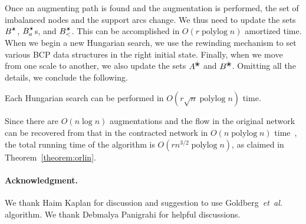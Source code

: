 \documentclass[11pt,twoside]{article}
\def\etal{\emph{et~al.}}
\def\etal{\textit{et~al.}}
\def\polylog{\mathop{\mathrm{polylog}}}
\def\alive#1{{#1}^\text{\ding{96}}}
\def\star{\text{\ding{84}}}
\theoremstyle{plain}
\numberwithin{figure}{section}
\renewcommand{\subparagraph}{\paragraph}
\begin{document}
Once an augmenting path is found and the augmentation is performed, the set of
imbalanced nodes and the support arcs change.
We thus need to update the sets $B^\star$, $B_a^\star$s, and $B_<^\star$.
This can be accomplished in $O(r\polylog n)$ amortized time.
When we begin a new Hungarian search, we use the rewinding mechanism
to set various BCP data structures in the right initial state.
Finally, when we move from one scale to another, we also update the sets
$\alive{A}$ and $\alive{B}$.
Omitting all the details, we conclude the following.

\begin{lemma}
Each Hungarian search can be performed in $O(r\sqrt{n}\polylog n)$ time.
\end{lemma}

Since there are $O(n\log n)$ augmentations and the flow in the original network
can be recovered from that in the contracted network in $O(n\polylog n)$
time~\cite{AFPVX17arxiv}, the total running time of the algorithm is
$O(rn^{3/2}\polylog n)$, as claimed in Theorem~\ref{theorem:orlin}.


\subparagraph*{Acknowledgment.}
We thank Haim Kaplan for discussion and suggestion to use Goldberg~\etal~\cite{GHKT17} algorithm.
We thank Debmalya Panigrahi for helpful discussions.





\appendix
\end{document}
